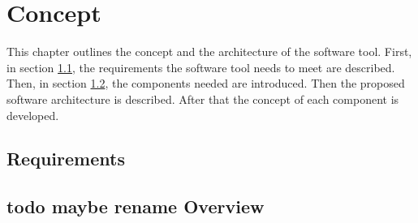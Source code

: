 
\chapter{Concept}\label{cha:Concept}
This chapter outlines the concept and the architecture of the software tool. First, in section \ref{sec:ConceptRequirements}, the requirements the software tool needs to meet are described. Then, in section \ref{sec:ConceptOverview}, the components needed are introduced. Then the proposed software architecture is described. After that the concept of each component is developed.

\section{Requirements}\label{sec:ConceptRequirements}
 
 
\section{todo maybe rename Overview}\label{sec:ConceptOverview}


